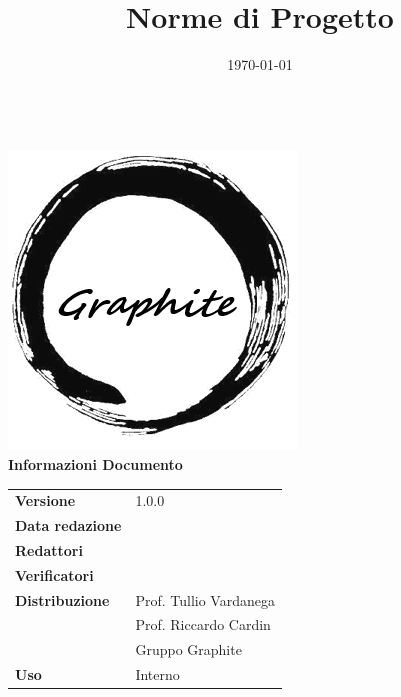 \documentclass[openany,12pt,a4paper]{report}
\title{Norme di Progetto}
\author{}
\date{\today}
\begin{document}
	\makeatletter
	\begin{titlepage}
		\setlength{\headsep}{0pt}  
		\begin{center}
			{\huge \bfseries  \@title }\\[10ex]
			\includegraphics[width=0.5\linewidth]{Logo.png}\\[1em]
			\textbf{\Large Informazioni Documento} \\[2em]
			\bgroup
			\def\arraystretch{1.5}
			\begin{tabular}{l|l}
				\textbf{Versione} & 1.0.0 \\
				\textbf{Data redazione} & \large \@date \\
				\textbf{Redattori} &  \\
				\textbf{Verificatori} &  \\
				\textbf{Distribuzione} & Prof. Tullio Vardanega \\
				 & Prof. Riccardo Cardin \\
				 & Gruppo Graphite \\
				\textbf{Uso} & Interno \\
			\end{tabular}
		\egroup
		\end{center}
	\end{titlepage}
	\makeatother

	\thispagestyle{empty}
	\newpage
	
	\tableofcontents
	
	
	
	
	
	
\end{document}
